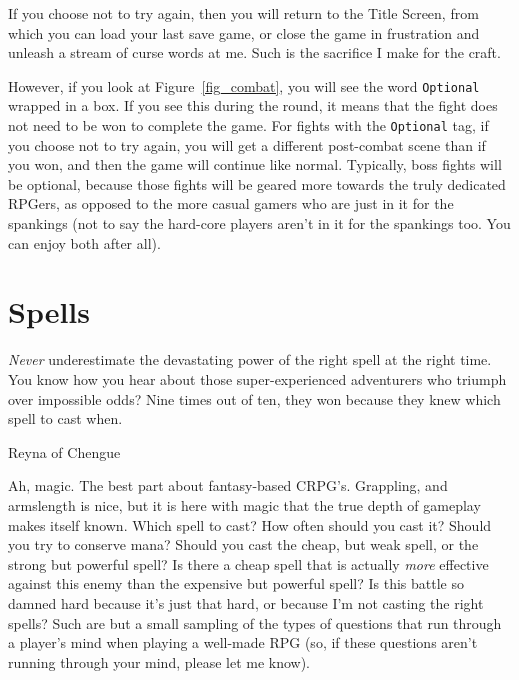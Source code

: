 \documentclass{report}
\begin{document}
If you choose not to try again, then you will return to the Title Screen, from
which you can load your last save game, or close the game in frustration and 
unleash a stream of curse words at me. Such is the sacrifice I make for the craft.

However, if you look at Figure~\ref{fig_combat}, you will see the word 
\verb|Optional| wrapped in a box. If you see this during the round, it means that
the fight does not need to be won to complete the game. For fights with the
\verb|Optional| tag, if you choose not to try again, you will get a different
post-combat scene than if you won, and then the game will continue like normal.
Typically, boss fights will
be optional, because those fights will be geared more towards the truly dedicated
RPGers, as opposed to the more casual
gamers who are just in it for the spankings (not to say the hard-core players 
aren't in it for the spankings too. You can enjoy both after all).

\chapter{Spells}
\label{ch_spells}
\epigraph{\emph{Never} underestimate the devastating power of the right spell at the right time. You know how you hear about those super-experienced adventurers who triumph
over impossible odds? Nine times out of ten, they won because they knew which spell to cast when.}{Reyna of Chengue}

Ah, magic. The best part about fantasy-based CRPG's. Grappling, and armslength is nice, but it is here with magic that the true depth of gameplay makes itself 
known. Which spell to cast? How often should you cast it? Should you try to conserve mana? Should you cast the cheap, but weak spell, or the strong but powerful spell?
Is there a cheap spell that is actually \emph{more} effective against this enemy than the expensive but powerful spell? Is this battle so damned hard because it's just
that hard, or because I'm not casting the right spells? Such are but a small sampling of the types of questions that run through a player's mind when playing a well-made
RPG (so, if these questions aren't running through your mind, please let me know). 
\end{document}
